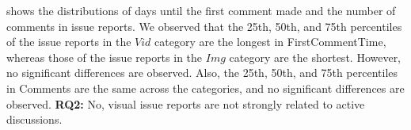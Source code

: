 shows the distributions of days until the first comment made and the number of comments in issue reports. 
We observed that the 25th, 50th, and 75th percentiles of the issue reports in the $Vid$ category are the longest in FirstCommentTime, whereas those of the issue reports in the $Img$ category are the shortest. 
However, no significant differences are observed. 
Also, the 25th, 50th, and 75th percentiles in Comments are the same across the categories, and no significant differences are observed. 
\summarybox
{{\bf RQ2: }{
    No, visual issue reports are not strongly related to active discussions. 
}}
